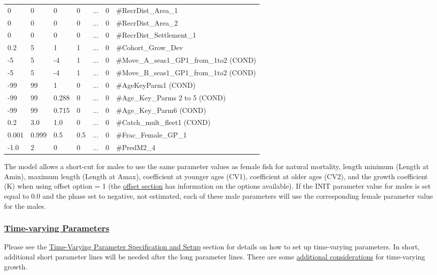 \begin{longtable}{p{1.1cm} p{1.1cm} p{1.1cm} p{1.1cm} p{1.5cm} p{1.1cm} p{6.75cm}}
	 0   & 0    & 0    & 0    & \multicolumn{1}{c}{...} & 0 & \#RecrDist\_Area\_1 \\
	 0   & 0    & 0    & 0    & \multicolumn{1}{c}{...} & 0 & \#RecrDist\_Area\_2 \\
	 0   & 0    & 0    & 0    & \multicolumn{1}{c}{...} & 0 & \#RecrDist\_Settlement\_1 \\
	 0.2 & 5    & 1    & 1    & \multicolumn{1}{c}{...} & 0 & \#Cohort\_Grow\_Dev \\
	-5   & 5    & -4   & 1    & \multicolumn{1}{c}{...} & 0 & \#Move\_A\_seas1\_GP1\_from\_1to2 (COND) \\
    -5   & 5    & -4   & 1    & \multicolumn{1}{c}{...} & 0 & \#Move\_B\_seas1\_GP1\_from\_1to2 (COND) \\
	-99  & 99   &  1   & 0    & \multicolumn{1}{c}{...} & 0 & \#AgeKeyParm1 (COND) \\
	-99  & 99   & 0.288 &  0  &...& 0 & \#Age\_Key\_Parms 2 to 5 (COND) \\
	-99  & 99   & 0.715 &  0  &...& 0 & \#Age\_Key\_Parm6 (COND) \\	
	0.2  & 3.0  & 1.0   &  0  &...& 0 & \#Catch\_mult\_fleet1 (COND) \\
	0.001 & 0.999 & 0.5 & 0.5 &...& 0 & \#Frac\_Female\_GP\_1 \\
	-1.0 & 2 & 0 & 0    &...& 0 & \#PredM2\_4 \Bstrut\\		
	\hline
\end{longtable}

\hypertarget{male-shortcut}{}
The model allows a short-cut for males to use the same parameter values as female fish for natural mortality, length minimum (Length at Amin), maximum length (Length at Amax), coefficient at younger ages (CV1), coefficient at older ages (CV2), and the growth coefficient (K) when using offset option = 1 (the \hyperlink{offset}{offset section} has information on the options available). If the INIT parameter value for males is set equal to 0.0 and the phase set to negative, not estimated, each of these male parameters will use the corresponding female parameter value for the males.

\hypertarget{TVParams}{}
\subsubsection[Time-varying Parameters]{\protect\hyperlink{TVParams}{Time-varying Parameters}}
Please see the \hyperlink{tvOrder}{Time-Varying Parameter Specification and Setup} section for details on how to set up time-varying parameters. In short, additional short parameter lines will be needed after the long parameter lines. There are some \hyperlink{tvgrowth}{additional considerations} for time-varying growth.

